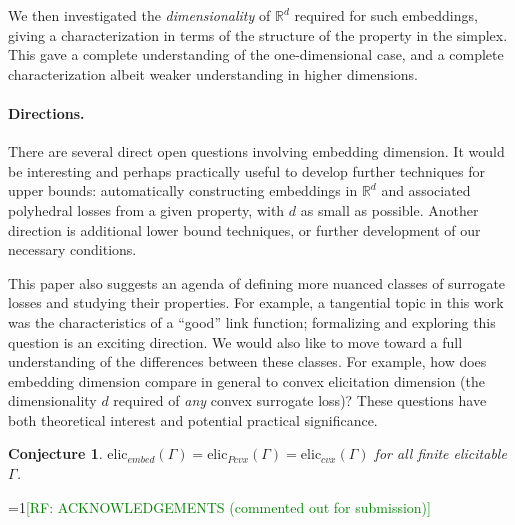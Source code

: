 \documentclass[12pt]{article}
\newcommand{\Comments}{1}
\newcommand{\mynote}[2]{\ifnum\Comments=1\textcolor{#1}{#2}\fi}
\newcommand{\raf}[1]{\mynote{green}{[RF: #1]}}
\newcommand{\reals}{\mathbb{R}}
\newtheorem{conjecture}{Conjecture}
\begin{document}
We then investigated the \emph{dimensionality} of $\reals^d$ required for such embeddings, giving a characterization in terms of the structure of the property in the simplex.
This gave a complete understanding of the one-dimensional case, and a complete characterization albeit weaker understanding in higher dimensions.

\paragraph{Directions.}
There are several direct open questions involving embedding dimension.
It would be interesting and perhaps practically useful to develop further techniques for upper bounds: automatically constructing embeddings in $\reals^d$ and associated polyhedral losses from a given property, with $d$ as small as possible.
Another direction is additional lower bound techniques, or further development of our necessary conditions.

This paper also suggests an agenda of defining more nuanced classes of surrogate losses and studying their properties.
For example, a tangential topic in this work was the characteristics of a ``good'' link function; formalizing and exploring this question is an exciting direction.
We would also like to move toward a full understanding of the differences between these classes.
For example, how does embedding dimension compare in general to convex elicitation dimension (the dimensionality $d$ required of \emph{any} convex surrogate loss)?
These questions have both theoretical interest and potential practical significance.

\begin{conjecture}
  $\mathrm{elic}_{embed}(\Gamma) = \mathrm{elic}_{Pcvx}(\Gamma) = \mathrm{elic}_{cvx}(\Gamma)$ for all finite elicitable $\Gamma$.
\end{conjecture}


\raf{ACKNOWLEDGEMENTS (commented out for submission)}


\end{document}
